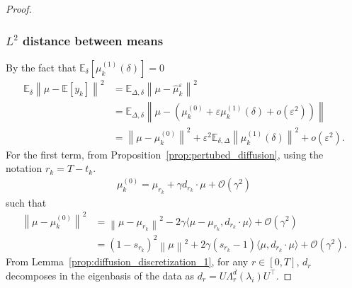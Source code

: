 \documentclass[11pt]{article}
\newcommand{\norm}[1]{\left\|{#1}\right\|}
\newcommand{\eqdef}{\coloneqq}
\newcommand{\EE}{\mathbb{E}}
\begin{document}
\begin{proof}
\subsubsection*{$L^2$ distance between means}
By the fact that $\EE_{\delta}\left[\mu_k^{(1)}(\delta)\right] = 0$ 
\begin{align}
\EE_{\delta} \norm{\mu - \EE[y_k]}^2 &= \EE_{\Delta, \delta}\norm{\mu - \hat \mu^\varepsilon_{k}}^2 \\
&= \EE_{\Delta, \delta}\norm{\mu - \left(\mu_k^{(0)} + \varepsilon \mu_k^{(1)}(\delta) + o(\varepsilon^2) \right)}  \\
&= \norm{\mu - \mu_k^{(0)}}^2 + \varepsilon^2 \EE_{\delta, \Delta} \norm{\mu_k^{(1)}(\delta)}^2 + o(\varepsilon^2)  \label{eq:509}.
\end{align}
For the first term, from Proposition~\ref{prop:pertubed_diffusion}, using the notation $r_k = T-t_k$.
\begin{align*}
\mu_k^{(0)} = \mu_{r_k} + \gamma d_{r_k} \cdot \mu + \mathcal{O}(\gamma^2)
\end{align*} 
such that
\begin{align} \label{eq:512}
\norm{\mu - \mu_k^{(0)}}^2 &= \norm{\mu - \mu_{r_k}}^2 -  2 \gamma \langle\mu - \mu_{r_k}, d_{r_k} \cdot \mu\rangle + \mathcal{O}(\gamma^2) \\
&= (1- s_{r_k})^2 \norm{\mu}^2 +  2 \gamma (s_{r_k}-1) \langle \mu, d_{r_k} \cdot \mu \rangle  +  \mathcal{O}(\gamma^2) .
\end{align} 
From Lemma~\ref{prop:diffusion_discretization_1}, for any $r \in [0,T]$, $d_r$ decomposes in the eigenbasis of the data as ${d_r = U \Lambda^{d}_r(\lambda_i) U^\top}$.

\end{proof}
\end{document}
